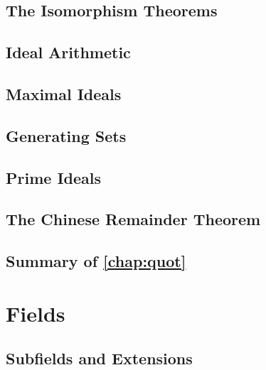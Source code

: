 \documentclass{memoir}
\begin{document}
    \section{The Isomorphism Theorems}
      \label{sec:iso-thms}
      
      \newpage

    \section{Ideal Arithmetic}
      \label{sec:ideal-lattice}
      
      \newpage

    \section{Maximal Ideals}
      \label{sec:max-ideals}
      
      \newpage

    \section{Generating Sets}
      \label{sec:gen-sets}
      
      \newpage

    \section{Prime Ideals}
      \newpage

    \section{The Chinese Remainder Theorem}
      \newpage

    \section*{Summary of \autoref{chap:quot}}
      

  \chapter{Fields}

    \section{Subfields and Extensions}
\end{document}
